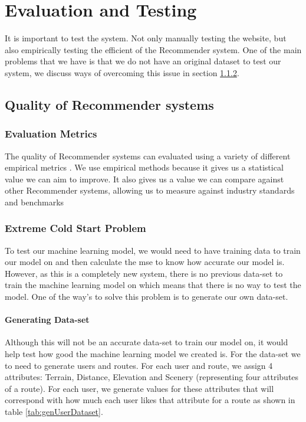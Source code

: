 \chapter{Evaluation and Testing}
It is important to test the system. Not only manually testing the website, but also empirically testing the efficient of the Recommender system. One of the main problems that we have is that we do not have an original dataset to test our system, we discuss ways of overcoming this issue in section \ref{coldStartProble}.
\section{Quality of Recommender systems}
\subsection{Evaluation Metrics} \label{subsec:evaluationMetrics}
The quality of Recommender systems can evaluated using a variety of different empirical metrics \cite{isinkaye2015recommendation}. We use empirical methods because it gives us a statistical value we can aim to improve. It also gives us a value we can compare against other Recommender systems, allowing us to measure against industry standards and benchmarks
\subsection{Extreme Cold Start Problem} \label{coldStartProble}
To test our machine learning model, we would need to have training data to train our model on and then calculate the \acrshort{mse} to know how accurate our model is. However, as this is a completely new system, there is no previous data-set to train the machine learning model on which means that there is no way to test the model. One of the way's to solve this problem is to generate our own data-set.

\subsubsection{Generating Data-set}
Although this will not be an accurate data-set to train our model on, it would help test how good the machine learning model we created is. For the data-set we to need to generate users and routes. For each user and route, we assign 4 attributes: Terrain, Distance, Elevation and Scenery (representing four attributes of a route). For each user, we generate values for these attributes that will correspond with how much each user likes that attribute for a route as shown in table \ref{tab:genUserDataset}. 

